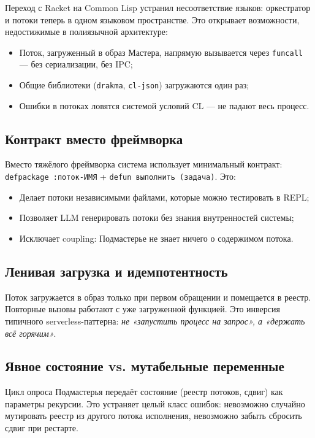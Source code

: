\documentclass[11pt,a4paper]{article}
\begin{document}
Переход с Racket на Common Lisp устранил несоответствие языков: оркестратор и потоки теперь в одном языковом пространстве. Это открывает возможности, недостижимые в полиязычной архитектуре:

\begin{itemize}[noitemsep]
  \item Поток, загруженный в образ Мастера, напрямую вызывается через \texttt{funcall} — без сериализации, без IPC;
  \item Общие библиотеки (\texttt{drakma}, \texttt{cl-json}) загружаются один раз;
  \item Ошибки в потоках ловятся системой условий CL — не падают весь процесс.
\end{itemize}

\subsection{Контракт вместо фреймворка}

Вместо тяжёлого фреймворка система использует минимальный контракт: \texttt{defpackage :поток-ИМЯ} + \texttt{defun выполнить (задача)}. Это:
\begin{itemize}[noitemsep]
  \item Делает потоки независимыми файлами, которые можно тестировать в REPL;
  \item Позволяет LLM генерировать потоки без знания внутренностей системы;
  \item Исключает coupling: Подмастерье не знает ничего о содержимом потока.
\end{itemize}

\subsection{Ленивая загрузка и идемпотентность}

Поток загружается в образ только при первом обращении и помещается в реестр. Повторные вызовы работают с уже загруженной функцией. Это инверсия типичного serverless-паттерна: \textit{не «запустить процесс на запрос», а «держать всё горячим»}.

\subsection{Явное состояние vs. мутабельные переменные}

Цикл опроса Подмастерья передаёт состояние (реестр потоков, сдвиг) как параметры рекурсии. Это устраняет целый класс ошибок: невозможно случайно мутировать реестр из другого потока исполнения, невозможно забыть сбросить сдвиг при рестарте.
\end{document}
